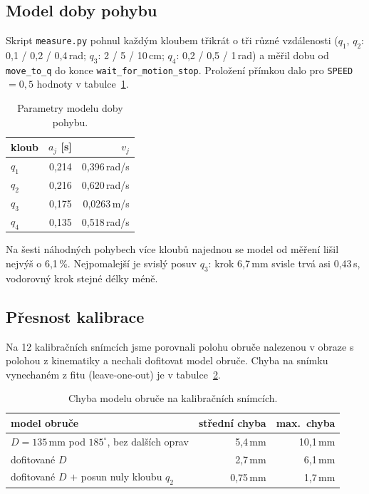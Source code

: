 \documentclass[11pt,a4paper]{article}
\begin{document}
\subsection{Model doby pohybu}
\label{sec:exp-model}

Skript \texttt{measure.py} pohnul každým kloubem třikrát o tři různé vzdálenosti ($q_1$, $q_2$:
0{,}1 / 0{,}2 / 0{,}4\,rad; $q_3$: 2 / 5 / 10\,cm; $q_4$: 0{,}2 / 0{,}5 / 1\,rad) a měřil dobu
od \texttt{move\_to\_q} do konce \texttt{wait\_for\_motion\_stop}. Proložení přímkou dalo pro
\texttt{SPEED} $= 0{,}5$ hodnoty v tabulce~\ref{tab:model}.

\begin{table}[ht]
\centering
\begin{tabular}{@{}l r r@{}}
\toprule
kloub & $a_j$ [s] & $v_j$ \\
\midrule
$q_1$ & 0{,}214 & 0{,}396\,rad/s \\
$q_2$ & 0{,}216 & 0{,}620\,rad/s \\
$q_3$ & 0{,}175 & 0{,}0263\,m/s \\
$q_4$ & 0{,}135 & 0{,}518\,rad/s \\
\bottomrule
\end{tabular}
\caption{Parametry modelu doby pohybu.}
\label{tab:model}
\end{table}

Na šesti náhodných pohybech více kloubů najednou se model od měření lišil nejvýš o 6{,}1\,\%.
Nejpomalejší je svislý posuv $q_3$: krok 6{,}7\,mm svisle trvá asi 0{,}43\,s, vodorovný krok
stejné délky méně.

\subsection{Přesnost kalibrace}
\label{sec:exp-kalib}

Na 12 kalibračních snímcích jsme porovnali polohu obruče nalezenou v obraze s polohou
z kinematiky a nechali dofitovat model obruče. Chyba na snímku vynechaném z fitu
(leave-one-out) je v tabulce~\ref{tab:kalib}.

\begin{table}[ht]
\centering
\begin{tabular}{@{}l r r@{}}
\toprule
model obruče & střední chyba & max.\ chyba \\
\midrule
$D = 135$\,mm pod $185^\circ$, bez dalších oprav & 5{,}4\,mm & 10{,}1\,mm \\
dofitované $D$ & 2{,}7\,mm & 6{,}1\,mm \\
dofitované $D$ $+$ posun nuly kloubu $q_2$ & 0{,}75\,mm & 1{,}7\,mm \\
\bottomrule
\end{tabular}
\caption{Chyba modelu obruče na kalibračních snímcích.}
\label{tab:kalib}
\end{table}
\end{document}
